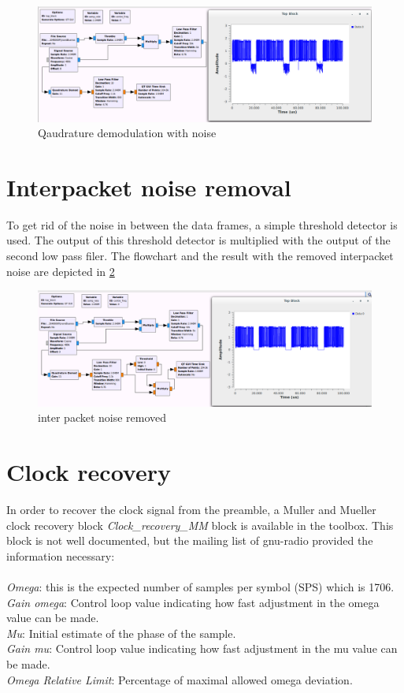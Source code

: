 \begin{figure}[h]
\centering
\includegraphics[width=1\linewidth]{figures/buenos_quadrature_demod}
\caption[quadrature demodulation]{Qaudrature demodulation with noise}
\label{fig:quaddemod_lowpas}
\end{figure}

\section{Interpacket noise removal} 
To get rid of the noise in between the data frames, a simple threshold detector is used. The output of this threshold detector is multiplied with the output of the second low pass filer. The flowchart and the result with the removed interpacket noise are depicted in \ref{fig:buenos_q_dem_improved}
 
 \begin{figure}[h]
\centering
\includegraphics[width=1\linewidth]{figures/buenos_q_dem_improved}
\caption[buenos_q_dem_improved]{inter packet noise removed}
\label{fig:buenos_q_dem_improved}
\end{figure}

\section{Clock recovery} 
In order to recover the clock signal from the preamble, a Muller and Mueller clock recovery block \emph{Clock\_recovery\_MM} block is available in the toolbox. This block is not well documented, but the mailing list of gnu-radio provided the information necessary\cite{GNU_MAILING_CLOCK_REC}:
\\\\
\emph{Omega}: this is the expected number of samples per symbol (SPS) which is 1706.\\
\emph{Gain omega}: Control loop value indicating how fast adjustment in the omega value can be made. \\
\emph{Mu}: Initial estimate of the phase of the sample.\\
\emph{Gain mu}: Control loop value indicating how fast adjustment in the mu value can be made. \\
\emph{Omega Relative Limit}: Percentage of maximal allowed omega deviation.\\

